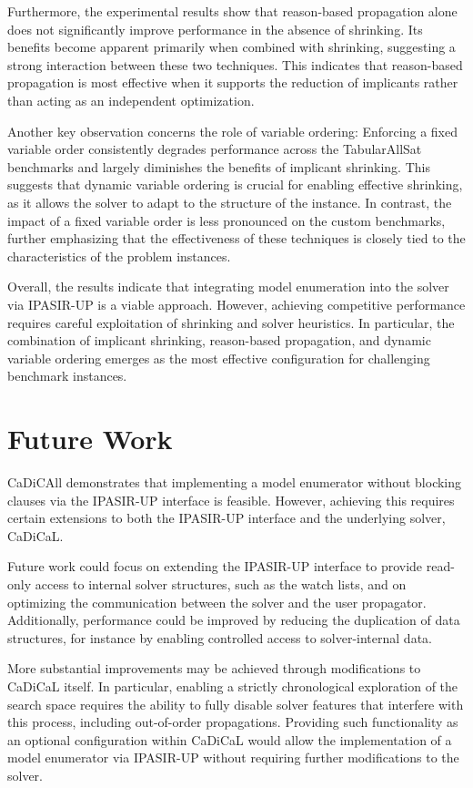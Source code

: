 \documentclass[12pt,a4paper]{article}
\begin{document}
Furthermore, the experimental results show that reason-based propagation alone does not significantly improve performance in the absence of shrinking. Its benefits become apparent primarily when combined with shrinking, suggesting a strong interaction between these two techniques. This indicates that reason-based propagation is most effective when it supports the reduction of implicants rather than acting as an independent optimization.

Another key observation concerns the role of variable ordering: Enforcing a fixed variable order consistently degrades performance across the TabularAllSat benchmarks and largely diminishes the benefits of implicant shrinking. This suggests that dynamic variable ordering is crucial for enabling effective shrinking, as it allows the solver to adapt to the structure of the instance. In contrast, the impact of a fixed variable order is less pronounced on the custom benchmarks, further emphasizing that the effectiveness of these techniques is closely tied to the characteristics of the problem instances.

Overall, the results indicate that integrating model enumeration into the solver via IPASIR-UP is a viable approach. However, achieving competitive performance requires careful exploitation of shrinking and solver heuristics. In particular, the combination of implicant shrinking, reason-based propagation, and dynamic variable ordering emerges as the most effective configuration for challenging benchmark instances.

\newpage

\section{Future Work}

CaDiCAll demonstrates that implementing a model enumerator without blocking clauses via the IPASIR-UP interface is feasible. However, achieving this requires certain extensions to both the IPASIR-UP interface and the underlying solver, CaDiCaL.

Future work could focus on extending the IPASIR-UP interface to provide read-only access to internal solver structures, such as the watch lists, and on optimizing the communication between the solver and the user propagator. Additionally, performance could be improved by reducing the duplication of data structures, for instance by enabling controlled access to solver-internal data.

More substantial improvements may be achieved through modifications to CaDiCaL itself. In particular, enabling a strictly chronological exploration of the search space requires the ability to fully disable solver features that interfere with this process, including out-of-order propagations. Providing such functionality as an optional configuration within CaDiCaL would allow the implementation of a model enumerator via IPASIR-UP without requiring further modifications to the solver.
\end{document}

